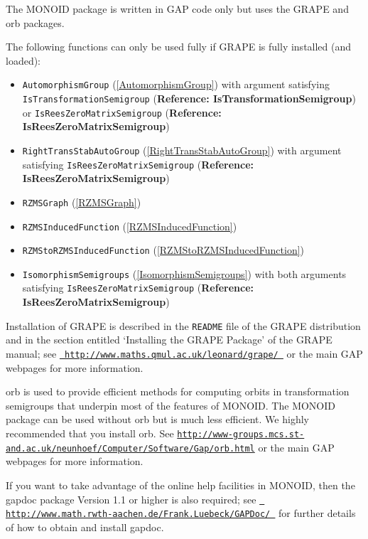 \documentclass[a4paper,11pt]{report}
\begin{document}
{{ The \textsf{MONOID} package is written in \textsf{GAP} code only but uses the \textsf{GRAPE} and \textsf{orb} packages.

 The following functions can only be used fully if \textsf{GRAPE} is fully installed (and loaded): 
\begin{itemize}
\item  \texttt{AutomorphismGroup} (\ref{AutomorphismGroup}) with argument satisfying \texttt{IsTransformationSemigroup} (\textbf{Reference: IsTransformationSemigroup}) or \texttt{IsReesZeroMatrixSemigroup} (\textbf{Reference: IsReesZeroMatrixSemigroup})
\item  \texttt{RightTransStabAutoGroup} (\ref{RightTransStabAutoGroup}) with argument satisfying \texttt{IsReesZeroMatrixSemigroup} (\textbf{Reference: IsReesZeroMatrixSemigroup})
\item \texttt{RZMSGraph} (\ref{RZMSGraph})
\item \texttt{RZMSInducedFunction} (\ref{RZMSInducedFunction})
\item \texttt{RZMStoRZMSInducedFunction} (\ref{RZMStoRZMSInducedFunction})
\item \texttt{IsomorphismSemigroups} (\ref{IsomorphismSemigroups}) with both arguments satisfying \texttt{IsReesZeroMatrixSemigroup} (\textbf{Reference: IsReesZeroMatrixSemigroup})
\end{itemize}
 Installation of \textsf{GRAPE} is described in the \texttt{README} file of the \textsf{GRAPE} distribution and in the section entitled `Installing the GRAPE Package' of the \textsf{GRAPE} manual; see \href{ http://www.maths.qmul.ac.uk/~leonard/grape/ } {\texttt{ http://www.maths.qmul.ac.uk/\texttt{}leonard/grape/ }} or the main \textsf{GAP} webpages for more information. 

 \textsf{orb} is used to provide efficient methods for computing orbits in transformation
semigroups that underpin most of the features of \textsf{MONOID}. The \textsf{MONOID} package can be used without \textsf{orb} but is much less efficient. We highly recommended that you install \textsf{orb}. See \href{http://www-groups.mcs.st-and.ac.uk/~neunhoef/Computer/Software/Gap/orb.html} {\texttt{http://www-groups.mcs.st-and.ac.uk/\texttt{}neunhoef/Computer/Software/Gap/orb.html}} or the main \textsf{GAP} webpages for more information. 

 If you want to take advantage of the online help facilities in \textsf{MONOID}, then the \textsf{gapdoc} package Version 1.1 or higher is also required; see \href{ http://www.math.rwth-aachen.de/~Frank.Luebeck/GAPDoc/ } {\texttt{ http://www.math.rwth-aachen.de/\texttt{}Frank.Luebeck/GAPDoc/ }} for further details of how to obtain and install \textsf{gapdoc}. }

}
\end{document}
